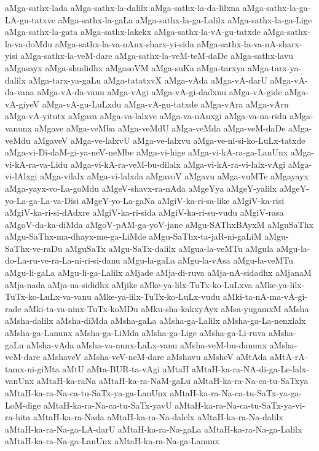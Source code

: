 {aMga-sathx-lada
aMga-sathx-la-dalilx
aMga-sathx-la-da-lilxna
aMga-sathx-la-ga-LA-gu-tatxve
aMga-sathx-la-gaLa
aMga-sathx-la-ga-Lalilx
aMga-sathx-la-ga-Lige
aMga-sathx-la-gata
aMga-sathx-lakekx
aMga-sathx-la-vA-gu-tatxde
aMga-sathx-la-va-doMdu
aMga-sathx-la-va-nAnx-sharx-yi-sida
aMga-sathx-la-va-nA-sharx-yisi
aMga-sathx-la-veM-dare
aMga-sathx-la-veM-teM-daDe
aMga-sathx-lavu
aMgasayx
aMga-shudidhx
aMgasoVM
aMga-suKa
aMga-tarxya
aMga-tarx-ya-dalilx
aMga-tarx-ya-gaLu
aMga-tatatxvX
aMga-vAda
aMga-vA-darU
aMga-vA-da-vana
aMga-vA-da-vanu
aMga-vAgi
aMga-vA-gi-dadxnu
aMga-vA-gide
aMga-vA-giyeV
aMga-vA-gu-LuLxdu
aMga-vA-gu-tatxde
aMga-vAra
aMga-vAru
aMga-vA-yitutx
aMgava
aMga-va-lalxve
aMga-va-nAnxgi
aMga-va-na-ridu
aMga-vanunx
aMgave
aMga-veMba
aMga-veMdU
aMga-veMda
aMga-veM-daDe
aMga-veMdu
aMgaveV
aMga-ve-lalxvU
aMga-ve-lalxvu
aMga-ve-ni-si-ko-LuLx-tatxde
aMga-vi-Di-daM-gi-ya-neV-neMbe
aMga-vi-hige
aMga-vi-kA-ra-ga-LanUnx
aMga-vi-kA-ra-va-Lidu
aMga-vi-kA-ra-veM-bu-dilalx
aMga-vi-kA-ra-vi-lalx-vAgi
aMga-vi-lAlxgi
aMga-vilalx
aMga-vi-lalxda
aMgavoV
aMgavu
aMga-vuMTe
aMgayayx
aMga-yayx-vo-La-goMdu
aMgeV-shavx-ra-nAda
aMgeYya
aMgeY-yalilx
aMgeY-yo-La-ga-La-va-Disi
aMgeY-yo-La-gaNa
aMgiV-ka-ri-sa-like
aMgiV-ka-risi
aMgiV-ka-ri-si-dAdxre
aMgiV-ka-ri-sida
aMgiV-ka-ri-su-vudu
aMgiV-rasa
aMgoV-da-ka-diMda
aMgoV-pAM-ga-yoV-jane
aMgu-SAThxBAyxM
aMguSaThx
aMgu-SaThx-ma-dhayx-me-ga-LiMde
aMgu-SaThx-ta-jaR-ni-gaLiM
aMgu-SaThx-ve-raDu
aMguSaTx
aMgu-SaTx-dalilx
aMgua-la-veMTu
aMgula
aMgu-la-do-La-ru-ve-ra-La-ni-ri-si-danu
aMgu-la-gaLa
aMgu-la-vAsa
aMgu-la-veMTu
aMgu-li-gaLa
aMgu-li-ga-Lalilx
aMjade
aMja-di-ruva
aMja-nA-sidadhx
aMjanaM
aMja-nada
aMja-na-sididhx
aMjike
aMke-ya-lilx-TuTx-ko-LuLxva
aMke-ya-lilx-TuTx-ko-LuLx-va-vanu
aMke-ya-lilx-TuTx-ko-LuLx-vudu
aMki-ta-nA-ma-vA-gi-rade
aMki-ta-va-ninx-TuTx-koMDu
aMku-sha-kakxyAyx
aMsa-yugamxM
aMsha
aMsha-dalilx
aMsha-diMda
aMsha-gaLa
aMsha-ga-Lalilx
aMsha-ga-La-nenxlalx
aMsha-ga-Lanunx
aMsha-ga-LiMda
aMsha-ga-Lige
aMsha-ga-Li-ruva
aMsha-gaLu
aMsha-vAda
aMsha-va-nunx-LaLx-vanu
aMsha-veM-bu-danunx
aMsha-veM-dare
aMshaveV
aMsha-veV-neM-dare
aMshavu
aMsheV
aMtAda
aMtA-rA-tamx-ni-giMta
aMtU
aMta-BUR-ta-vAgi
aMtaH
aMtaH-ka-ra-NA-di-ga-Le-lalx-vanUnx
aMtaH-ka-raNa
aMtaH-ka-ra-NaM-gaLu
aMtaH-ka-ra-Na-ca-tu-SaTxya
aMtaH-ka-ra-Na-ca-tu-SaTx-ya-ga-LanUnx
aMtaH-ka-ra-Na-ca-tu-SaTx-ya-ga-LoM-dige
aMtaH-ka-ra-Na-ca-tu-SaTx-yavU
aMtaH-ka-ra-Na-ca-tu-SaTx-ya-vi-ra-hita
aMtaH-ka-ra-Nada
aMtaH-ka-ra-Na-dalelx
aMtaH-ka-ra-Na-dalilx
aMtaH-ka-ra-Na-ga-LA-darU
aMtaH-ka-ra-Na-gaLa
aMtaH-ka-ra-Na-ga-Lalilx
aMtaH-ka-ra-Na-ga-LanUnx
aMtaH-ka-ra-Na-ga-Lanunx
}
